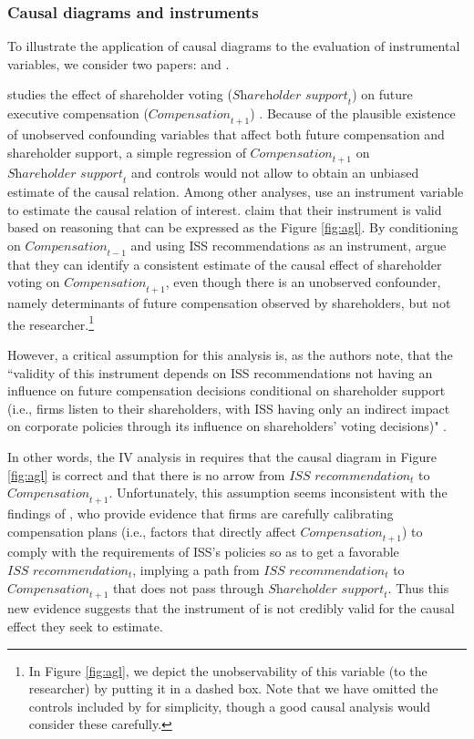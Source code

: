 \documentclass[11pt,reqno,titlepage]{amsart}
\begin{document}
\begin{doublespace}
\subsubsection{Causal diagrams and instruments}
To illustrate the application of causal diagrams to the evaluation of instrumental variables, we consider two papers: \citet{Armstrong:2013io} and \citet{Balakrishnan:2014js}. 

\citet{Armstrong:2013io} studies the effect of shareholder voting ($\textit{Shareholder support}_{t}$) on future executive compensation ($\textit{Compensation}_{t+1}$) .
Because of the plausible existence of unobserved confounding variables that affect both future compensation and shareholder support, a simple regression of $\textit{Compensation}_{t+1}$ on $\textit{Shareholder support}_{t}$ and controls would not allow \citet{Armstrong:2013io} to obtain an unbiased estimate of the causal relation.
Among other analyses, \citet{Armstrong:2013io} use an instrument variable to estimate the causal relation of interest.
\citet{Armstrong:2013io} claim that their instrument is valid based on reasoning that can be expressed as the  Figure \ref{fig:agl}.
By conditioning on $\textit{Compensation}_{t-1}$ and using ISS recommendations as an instrument, \citet{Armstrong:2013io} argue that they can identify a consistent estimate of the causal effect of shareholder voting on $\textit{Compensation}_{t+1}$, even though there is an unobserved confounder, namely determinants of future compensation observed by shareholders, but not the researcher.\footnote{
In Figure \ref{fig:agl}, we depict the unobservability of this variable (to the researcher) by putting it in a dashed box.
Note that we have omitted the controls included by \citet{Armstrong:2013io} for simplicity, though a good causal analysis would consider these carefully.}

However, a critical assumption for this analysis is, as the authors note, that the ``validity of this instrument depends on ISS recommendations not having an influence on future compensation decisions conditional on shareholder support (i.e., firms listen to their shareholders, with ISS having only an indirect impact on corporate policies through its influence on shareholders' voting decisions)" \citep[p.\,912]{Armstrong:2013io}.

In other words, the IV analysis in \citet[p.\,912]{Armstrong:2013io} requires that the causal diagram in Figure \ref{fig:agl} is correct and that there is no arrow from $\textit{ISS recommendation}_t$ to $\textit{Compensation}_{t+1}$. 
Unfortunately, this assumption seems inconsistent with the findings of \citet{Gow:2013aa}, who provide evidence that firms are carefully calibrating compensation plans (i.e., factors that directly affect $\textit{Compensation}_{t+1}$) to comply with the requirements of ISS's policies so as to get a favorable $\textit{ISS recommendation}_t$, implying a path from $\textit{ISS recommendation}_t$ to $\textit{Compensation}_{t+1}$ that does not pass through $\textit{Shareholder support}_{t}$.
Thus this new evidence suggests that the instrument of \citet[p.\,912]{Armstrong:2013io} is not credibly valid for the causal effect they seek to estimate.


\end{doublespace}
\end{document}
